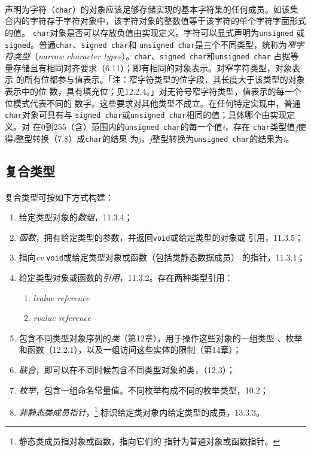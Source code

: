 \paragraph{}
声明为字符（\texttt{char}）的对象应该足够存储实现的基本字符集的任何成员。如该集
合内的字符存于字符对象中，该字符对象的整数值等于该字符的单个字符字面形式的值。
\texttt{char}对象是否可以存放负值由实现定义。字符可以显式声明为\texttt{unsigned}
或\texttt{signed}。普通\texttt{char}、\texttt{signed char}和
\texttt{unsigned char}是三个不同类型，统称为\textit{窄字符类型}（\textit{narrow
character types}）。\texttt{char}、\texttt{signed char}和\texttt{unsigned char}
占据等量存储且有相同对齐要求（6.11）；即有相同的对象表示。对窄字符类型，对象表示
的所有位都参与值表示。「注：窄字符类型的位字段，其长度大于该类型的对象表示中的位
数，具有填充位；见12.2.4。」对无符号窄字符类型，值表示的每一个位模式代表不同的
数字。这些要求对其他类型不成立。在任何特定实现中，普通\texttt{char}对象可具有与
\texttt{signed char}或\texttt{unsigned char}相同的值；具体哪个由实现定义。对
在0到255（含）范围内的\texttt{unsigned char}的每一个值\textit{i}，存在
\texttt{char}类型值\textit{j}使得\textit{i}整型转换（7.8）成\texttt{char}的结果
为\textit{j}，\textit{j}整型转换为\texttt{unsigned char}的结果为\textit{i}。

\subsection{复合类型}
\paragraph{}
复合类型可按如下方式构建：
\begin{enumerate}
  \item{给定类型对象的\textit{数组}，11.3.4；}
  \item{\textit{函数}，拥有给定类型的参数，并返回\texttt{void}或给定类型的对象或
    引用，11.3.5；}
  \item{指向\textit{cv} \texttt{void}或给定类型对象或函数（包括类静态数据成员）
    的指针，11.3.1；}
  \item{给定类型对象或函数的\textit{引用}，11.3.2。存在两种类型引用：
      \begin{enumerate}
        \item{\textit{lvalue reference}}
        \item{\textit{rvalue reference}}
    \end{enumerate}}
  \item{包含不同类型对象序列的\textit{类}（第12章），用于操作这些对象的一组类型
    、枚举和函数（12.2.1），以及一组访问这些实体的限制（第14章）；}
  \item{\textit{联合}，即可以在不同时候包含不同类型对象的类，（12.3）；}
  \item{\textit{枚举}，包含一组命名常量值。不同枚举构成不同的枚举类型，10.2；}
  \item{\textit{非静态类成员指针}，\footnote{静态类成员指对象或函数，指向它们的
    指针为普通对象或函数指针。} 标识给定类对象内给定类型的成员，13.3.3。}
\end{enumerate}

